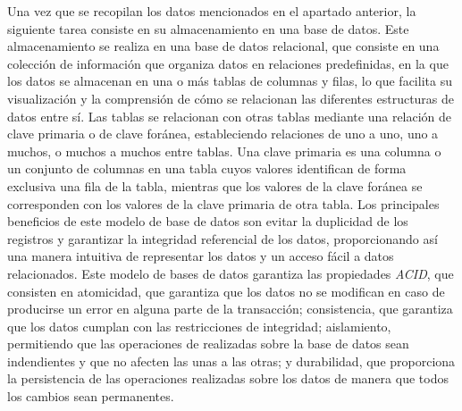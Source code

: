 \documentclass[a4paper, 12pt]{book}
\begin{document}
Una vez que se recopilan los datos mencionados en el apartado anterior, la siguiente tarea consiste en su almacenamiento en una base de datos. Este almacenamiento se realiza en una base de datos relacional, que consiste en una colección de información que organiza datos
en relaciones predefinidas, en la que los datos se almacenan en una o más tablas de columnas y filas, lo que facilita su visualización y la comprensión de cómo se relacionan las diferentes estructuras de datos entre sí. Las tablas se relacionan con otras tablas mediante una
relación de clave primaria o de clave foránea, estableciendo relaciones de uno a uno, uno a muchos, o muchos a muchos entre tablas. Una clave primaria es una columna o un conjunto de columnas en una tabla cuyos valores identifican de forma exclusiva una fila de la tabla, mientras
que los valores de la clave foránea se corresponden con los valores de la clave primaria de otra tabla. Los principales beneficios de este modelo de base de datos son evitar la duplicidad de los registros y garantizar la integridad referencial de los datos, proporcionando así una
manera intuitiva de representar los datos y un acceso fácil a datos relacionados. Este modelo de bases de datos garantiza las propiedades \textit{ACID}, que consisten en atomicidad, que garantiza que los datos no se modifican en caso de producirse un error en alguna parte de la
transacción; consistencia, que garantiza que los datos cumplan con las restricciones de integridad; aislamiento, permitiendo que las operaciones de realizadas sobre la base de datos sean indendientes y que no afecten las unas a las otras; y durabilidad, que proporciona la persistencia
de las operaciones realizadas sobre los datos de manera que todos los cambios sean permanentes.
\end{document}
